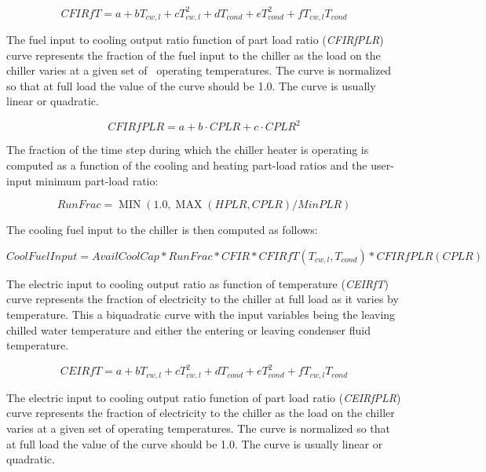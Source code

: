 \begin{equation}
CFIRfT = a + b{T_{cw,l}} + cT_{cw,l}^2 + d{T_{cond}} + eT_{cond}^2 + f{T_{cw,l}}{T_{cond}}
\end{equation}

The fuel input to cooling output ratio function of part load ratio (\emph{CFIRfPLR}) curve represents the fraction of the fuel input to the chiller as the load on the chiller varies at a given set of~ operating temperatures. The curve is normalized so that at full load the value of the curve should be 1.0. The curve is usually linear or quadratic.

\begin{equation}
CFIRfPLR = a + b \cdot CPLR + c \cdot CPL{R^2}
\end{equation}

The fraction of the time step during which the chiller heater is operating is computed as a function of the cooling and heating part-load ratios and the user-input minimum part-load ratio:

\begin{equation}
RunFrac = \operatorname{MIN} \left( {1.0,\operatorname{MAX} \left( {HPLR,CPLR} \right)/MinPLR} \right)
\end{equation}

The cooling fuel input to the chiller is then computed as follows:

\begin{equation}
CoolFuelInput = AvailCoolCap * RunFrac * CFIR * CFIRfT(T_{cw,l},T_{cond}) * CFIRfPLR(CPLR)
\end{equation}

The electric input to cooling output ratio as function of temperature (\emph{CEIRfT}) curve represents the fraction of electricity to the chiller at full load as it varies by temperature. This a biquadratic curve with the input variables being the leaving chilled water temperature and either the entering or leaving condenser fluid temperature.

\begin{equation}
CEIRfT = a + b{T_{cw,l}} + cT_{cw,l}^2 + d{T_{cond}} + eT_{cond}^2 + f{T_{cw,l}}{T_{cond}}
\end{equation}

The electric input to cooling output ratio function of part load ratio (\emph{CEIRfPLR}) curve represents the fraction of electricity to the chiller as the load on the chiller varies at a given set of operating temperatures. The curve is normalized so that at full load the value of the curve should be 1.0. The curve is usually linear or quadratic.

